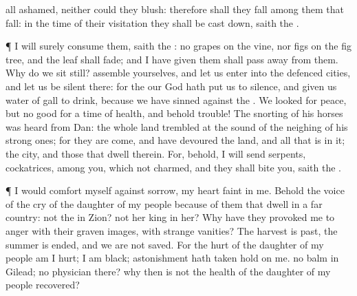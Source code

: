 {all
ashamed, neither
could they
blush: therefore shall they
fall among them that
fall: in the
time of their
visitation they shall be cast
down,
saith the
{}.
\par }{\PP {}¶ I will
surely
consume them,
saith the
{}:
{} no
grapes on the
vine, nor
figs on the fig
tree, and the
leaf shall
fade; and
{} I have
given them shall pass
away from them.
Why do we sit
still?
assemble yourselves, and let us
enter into the
defenced
cities, and let us be
silent there: for the
{} our
God hath put us to
silence, and given us
water of
gall to
drink, because we have
sinned against the
{}.
We
looked for
peace, but no
good
{} for a
time of
health, and behold
trouble!
The
snorting of his
horses was
heard from
Dan: the whole
land
trembled at the
sound of the
neighing of his strong
ones; for they are
come, and have
devoured the
land, and
all that is in it; the
city, and those that
dwell therein.
For, behold, I will
send
serpents,
cockatrices, among you, which
{} not
{}
charmed, and they shall
bite you,
saith the
{}.
\par }{\PP {}¶
{} I would
comfort myself against
sorrow, my
heart
{}
faint in me.
Behold the
voice of the
cry of the
daughter of my
people because of them that dwell in a
far
country:
{} not the
{} in
Zion?
{} not her
king in her? Why have they provoked me to
anger with their graven
images,
{} with
strange
vanities?
The
harvest is
past, the
summer is
ended, and we are not
saved.
For the
hurt of the
daughter of my
people am I
hurt; I am
black;
astonishment hath taken
hold on me.
 no
balm in
Gilead;
{} no
physician there? why
then is not the
health of the
daughter of my
people
recovered?

}
